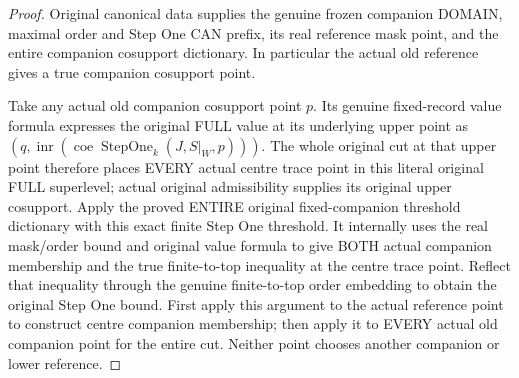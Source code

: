 \begin{proof}
Original canonical data supplies the genuine frozen companion DOMAIN,
maximal order and Step One CAN prefix, its real reference mask point, and
the entire companion cosupport dictionary. In particular the actual old
reference gives a true companion cosupport point.

Take any actual old companion cosupport point $p$. Its genuine fixed-record
value formula expresses the original FULL value at its underlying upper
point as $(q,\operatorname{inr}(\operatorname{coe}\operatorname{StepOne}_k
(J,S|_W,p)))$. The whole original cut at that upper point therefore places
EVERY actual centre trace point in this literal original FULL superlevel;
actual original admissibility supplies its original upper cosupport.
Apply the proved ENTIRE original fixed-companion threshold dictionary with
this exact finite Step One threshold. It internally uses the real mask/order
bound and original value formula to give BOTH actual companion membership
and the true finite-to-top inequality at the centre trace point. Reflect
that inequality through the genuine finite-to-top order embedding to obtain
the original Step One bound. First apply this argument to the actual
reference point to construct centre companion membership; then apply it to
EVERY actual old companion point for the entire cut. Neither point chooses
another companion or lower reference.
\end{proof}

